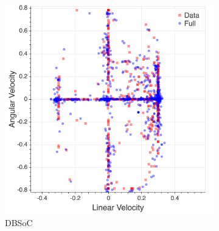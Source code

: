 \documentclass[letterpaper, 10 pt, conference]{ieeeconf}
\begin{document}
  	\begin{figure}[tbh]
      \begin{subfigure}[b]{0.45\columnwidth}

    \includegraphics[scale = 0.09]{images/full_dist.png}
    \caption{DBSoC}
    \label{fig:data1}
  \end{subfigure}
    	\hspace{5mm}
  \begin{subfigure}[b]{0.45\columnwidth}


\end{subfigure}
\end{figure}
\end{document}
